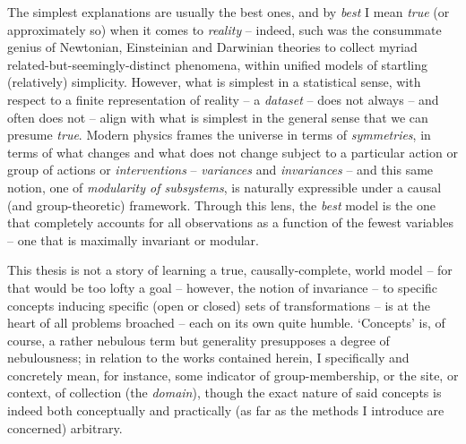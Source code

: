 The simplest explanations are usually the best ones, and by \emph{best} I mean \emph{true} (or
approximately so) when it comes to \emph{reality} -- indeed, such was the consummate genius of
Newtonian, Einsteinian and Darwinian theories to collect myriad related-but-seemingly-distinct
phenomena, within unified models of startling (relatively) simplicity.
%
However, what is simplest in a statistical sense, with respect to a finite representation of
reality -- a \emph{dataset} -- does not always -- and often does not -- align with what is simplest
in the general sense that we can presume \emph{true}.
%
Modern physics frames the universe in terms of \emph{symmetries}, in terms of what changes and what
does not change subject to a particular action or group of actions or \emph{interventions} --
\emph{variances} and \emph{invariances} -- and this same notion, one of \emph{modularity of
subsystems}, is naturally expressible under a causal (and group-theoretic) framework.
%
Through this lens, the \emph{best} model is the one that completely accounts for all observations
as a function of the fewest variables -- one that is maximally invariant or modular.

%
This thesis is not a story of learning a true, causally-complete, world model -- for that would be
too lofty a goal -- however, the notion of invariance -- to specific concepts inducing specific
(open or closed) sets of transformations -- is at the heart of all problems broached -- each on
its own quite humble.
%
`Concepts' is, of course, a rather nebulous term but generality presupposes a degree of
nebulousness; in relation to the works contained herein, I specifically and concretely mean, for
instance, some indicator of group-membership, or the site, or context, of collection (the
\emph{domain}), though the exact nature of said concepts is indeed both conceptually and
practically (as far as the methods I introduce are concerned) arbitrary.
%

